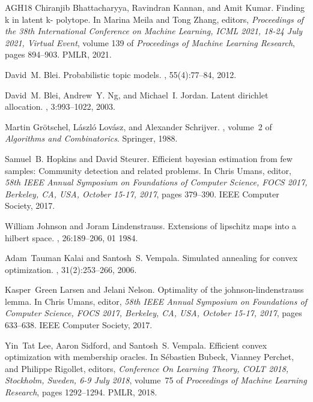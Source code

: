 \documentclass[11pt,letterpaper]{article}
\theoremstyle{definition}
\theoremstyle{remark}
\begin{document}
{\begin{thebibliography}{AGH{\etalchar{+}}18}
Chiranjib Bhattacharyya, Ravindran Kannan, and Amit Kumar.
\newblock Finding k in latent k- polytope.
\newblock In Marina Meila and Tong Zhang, editors, {\em Proceedings of the 38th
  International Conference on Machine Learning, {ICML} 2021, 18-24 July 2021,
  Virtual Event}, volume 139 of {\em Proceedings of Machine Learning Research},
  pages 894--903. {PMLR}, 2021.

David~M. Blei.
\newblock Probabilistic topic models.
, 55(4):77--84, 2012.

David~M. Blei, Andrew~Y. Ng, and Michael~I. Jordan.
\newblock Latent dirichlet allocation.
, 3:993--1022, 2003.

Martin Gr{\"{o}}tschel, L{\'{a}}szl{\'{o}} Lov{\'{a}}sz, and Alexander
  Schrijver.
, volume~2
  of {\em Algorithms and Combinatorics}.
\newblock Springer, 1988.

Samuel~B. Hopkins and David Steurer.
\newblock Efficient bayesian estimation from few samples: Community detection
  and related problems.
\newblock In Chris Umans, editor, {\em 58th {IEEE} Annual Symposium on
  Foundations of Computer Science, {FOCS} 2017, Berkeley, CA, USA, October
  15-17, 2017}, pages 379--390. {IEEE} Computer Society, 2017.

William Johnson and Joram Lindenstrauss.
\newblock Extensions of lipschitz maps into a hilbert space.
, 26:189--206, 01 1984.

Adam~Tauman Kalai and Santosh~S. Vempala.
\newblock Simulated annealing for convex optimization.
, 31(2):253--266, 2006.

Kasper~Green Larsen and Jelani Nelson.
\newblock Optimality of the johnson-lindenstrauss lemma.
\newblock In Chris Umans, editor, {\em 58th {IEEE} Annual Symposium on
  Foundations of Computer Science, {FOCS} 2017, Berkeley, CA, USA, October
  15-17, 2017}, pages 633--638. {IEEE} Computer Society, 2017.

Yin~Tat Lee, Aaron Sidford, and Santosh~S. Vempala.
\newblock Efficient convex optimization with membership oracles.
\newblock In S{\'{e}}bastien Bubeck, Vianney Perchet, and Philippe Rigollet,
  editors, {\em Conference On Learning Theory, {COLT} 2018, Stockholm, Sweden,
  6-9 July 2018}, volume~75 of {\em Proceedings of Machine Learning Research},
  pages 1292--1294. {PMLR}, 2018.


\end{thebibliography}}
\end{document}
